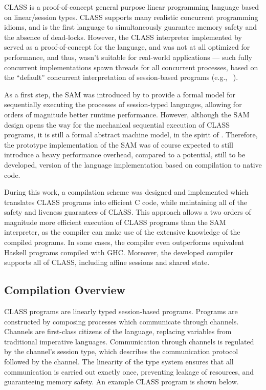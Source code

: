 \documentclass[sigconf,nonacm,natbib=true]{acmart}
\begin{document}
\acs{CLASS} \citep{Rocha:2021, Rocha:2023, Rocha:2022} is a proof-of-concept general purpose linear programming language based on linear/session types.
\acs{CLASS} supports many realistic concurrent programming idioms, and is the first language to simultaneously guarantee memory safety and the absence of dead-locks.
%
However, the \acs{CLASS} interpreter implemented by \citet{Rocha:2021:artifact,Rocha:2023:artifact} served as a proof-of-concept for the language, and was not at all optimized for performance, and thus, wasn't suitable for real-world applications --- such fully concurrent implementations spawn threads for all concurrent processes, based on the ``default'' concurrent interpretation of session-based programs (e.g., ~\citep{FreeST:2019,Jespersen:2015}).
%

%
As a first step, the \acf{SAM}  was introduced by \citet{Caires:2024} to provide a formal model for sequentially executing the processes of session-typed languages, allowing for orders of magnitude better runtime performance.
However, although the \ac{SAM} design opens the way for the mechanical sequential execution of CLASS programs, it is still a formal abstract machine model, in the spirit of \citep{Landin:1964,Lafont:1988}. Therefore, the prototype implementation of the SAM \citep{Caires:2024:artifact} was of course expected to still introduce a heavy performance overhead, compared to a potential, still to be developed, version of the language implementation based on compilation to native code.

During this work, a compilation scheme was designed and implemented which translates \acs{CLASS} programs into efficient C code, while maintaining all of the safety and liveness guarantees of \acs{CLASS}. This approach allows a two orders of magnitude more efficient execution of \acs{CLASS} programs than the \ac{SAM} interpreter, as the compiler can make use of the extensive knowledge of the compiled programs. In some cases, the compiler even outperforms equivalent Haskell programs compiled with GHC. Moreover, the developed compiler supports all of \acs{CLASS}, including affine sessions and shared state.

\subsection{Compilation Overview}

\ac{CLASS} programs are linearly typed session-based programs. Programs are constructed by composing processes which communicate through channels. Channels are first-class citizens of the language, replacing variables from traditional imperative languages. Communication through channels is regulated by the channel's session type, which describes the communication protocol followed by the channel. The linearity of the type system ensures that all communication is carried out exactly once, preventing leakage of resources, and guaranteeing memory safety. An example \ac{CLASS} program is shown below.
\end{document}
